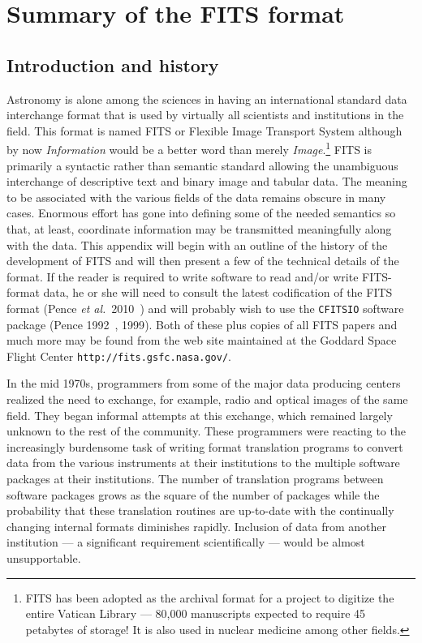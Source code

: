 \documentclass[twoside]{article}
\newcommand{\etal}{{\it et al.}}
\newcommand{\keyw}[1]{\hbox{{\tt #1}}}
\begin{document}
\vfill\eject
\appendix

\section{Summary of the FITS format}
\label{Appen:FITS}

\subsection{Introduction and history}

Astronomy is alone among the sciences in having an international
standard data interchange format that is used by virtually all
scientists and institutions in the field.  This format is named FITS
or Flexible Image Transport System although by now {\it Information}
would be a better word than merely {\it Image}.\footnote{FITS has been
  adopted as the archival format for a project to digitize the entire
  Vatican Library --- 80,000 manuscripts expected to require 45
  petabytes of storage!  It is also used in nuclear medicine among
  other fields.}  FITS is primarily a syntactic rather than semantic
standard allowing the unambiguous interchange of descriptive text and
binary image and tabular data.  The meaning to be associated with the
various fields of the data remains obscure in many cases.  Enormous
effort has gone into defining some of the needed semantics so that, at
least, coordinate information may be transmitted meaningfully along
with the data.  This appendix will begin with an outline of the
history of the development of FITS and will then present a few of the
technical details of the format. If the reader is required to write
software to read and/or write FITS-format data, he or she will need to
consult the latest codification of the FITS format (Pence
\etal~2010~\cite{PCPSS10}) and will probably wish to use the
\keyw{CFITSIO} software package (Pence 1992~\cite{P92},
1999\cite{P99}).  Both of these plus copies of all FITS papers and
much more may be found from the web site maintained at the Goddard
Space Flight Center \keyw{http://fits.gsfc.nasa.gov/}.

In the mid 1970s, programmers from some of the major data producing
centers realized the need to exchange, for example, radio and optical
images of the same field.  They began informal attempts at this
exchange, which remained largely unknown to the rest of the community.
These programmers were reacting to the increasingly burdensome task of
writing format translation programs to convert data from the various
instruments at their institutions to the multiple software packages at
their institutions.  The number of translation programs between
software packages grows as the square of the number of packages while
the probability that these translation routines are up-to-date with
the continually changing internal formats diminishes rapidly.
Inclusion of data from another institution --- a significant
requirement scientifically --- would be almost unsupportable.
\end{document}
